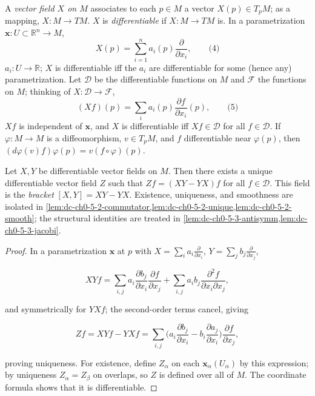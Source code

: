 \begin{definition}
  \label{def:dc-ch0-5-1}


  A \emph{vector field $X$ on $M$} associates to each $p\in M$ a vector $X(p)\in T_pM$;
  as a mapping, $X:M\to TM$. $X$ is \emph{differentiable} if $X:M\to TM$
  is. In a parametrization $\mathbf{x}:U\subset\mathbb{R}^n\to M$,
  $$
  X(p)=\sum_{i=1}^n a_i(p)\frac{\partial}{\partial x_i},\qquad\text{(4)}
  $$
  $a_i:U\to\mathbb{R}$; $X$ is differentiable iff the $a_i$ are differentiable for
  some (hence any) parametrization. Let $\mathcal{D}$ be the differentiable
  functions on $M$ and $\mathcal{F}$ the functions on $M$; thinking of
  $X:\mathcal{D}\to\mathcal{F}$,
  $$
  (Xf)(p)=\sum_i a_i(p)\frac{\partial f}{\partial x_i}(p),\qquad\text{(5)}
  $$
  $Xf$ is independent of $\mathbf{x}$, and $X$ is differentiable iff
  $Xf\in\mathcal{D}$ for all $f\in\mathcal{D}$. If $\varphi:M\to M$ is a
  diffeomorphism, $v\in T_pM$, and $f$ differentiable near $\varphi(p)$, then
  $(d\varphi(v)f)\varphi(p)=v(f\circ\varphi)(p)$.
\end{definition}

\begin{lemma}
  \label{lem:dc-ch0-5-2}


  Let $X,Y$ be differentiable vector fields on $M$. Then there exists a unique
  differentiable vector field $Z$ such that $Zf=(XY-YX)f$ for all
  $f\in\mathcal{D}$. This field is the \emph{bracket} $[X,Y]=XY-YX$.
  Existence, uniqueness, and smoothness are isolated in
  \cref{lem:dc-ch0-5-2-commutator,lem:dc-ch0-5-2-unique,lem:dc-ch0-5-2-smooth};
  the structural identities are treated in \cref{lem:dc-ch0-5-3-antisymm,lem:dc-ch0-5-3-jacobi}.
\end{lemma}
\begin{proof}
  \sketch

  In a parametrization $\mathbf{x}$ at $p$ with
  $X=\sum_i a_i\frac{\partial}{\partial x_i}$,
  $Y=\sum_j b_j\frac{\partial}{\partial x_j}$,

  $$
  XYf=\sum_{i,j}a_i\frac{\partial b_j}{\partial x_i}\frac{\partial f}{\partial x_j}+\sum_{i,j}a_i b_j\frac{\partial^2 f}{\partial x_i\partial x_j},
  $$

  and symmetrically for $YXf$; the second-order terms cancel, giving

  $$
  Zf=XYf-YXf=\sum_{i,j}\Big(a_i\frac{\partial b_j}{\partial x_i}-b_i\frac{\partial a_j}{\partial x_i}\Big)\frac{\partial f}{\partial x_j},
  $$

  proving uniqueness. For existence, define $Z_\alpha$ on each
  $\mathbf{x}_\alpha(U_\alpha)$ by this expression; by uniqueness $Z_\alpha=Z_\beta$
  on overlaps, so $Z$ is defined over all of $M$. The coordinate formula shows
  that it is differentiable.
\end{proof}

